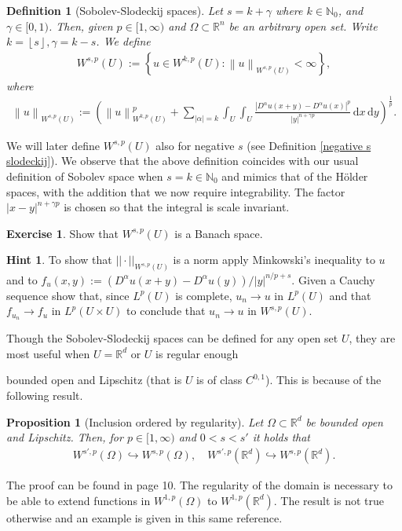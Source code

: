 \documentclass[
    a4paper,
    DIV=14,
    abstract=true,
    numbers=noenddot
]
{scrartcl}
\newtheorem{proposition}[theorem]{Proposition}
\newtheorem{definition}[theorem]{Definition}
\theoremstyle{definition}
\newtheorem{exercise}{Exercise}
\newtheorem*{hint}{Hint}
\newcommand{\set}[1]{\left\{#1\right\}}
\renewcommand{\norm}[1]{\left\lVert #1 \right\rVert}\renewcommand{\abs}[1]{\left| #1 \right|}
\renewcommand{\d}{\,\mathrm{d}}\newcommand{\dx}{\,\mathrm{d}x}
\newcommand{\N}{\mathbb{N}}
\newcommand{\R}{\mathbb{R}}
\begin{document}
\begin{definition}[Sobolev-Slodeckij spaces]\label{soledkij def}
    Let $s=k+\gamma$ where $k \in \N_0$, and $\gamma \in [0,1)$. Then, given  $p \in [1,\infty)$ and $\Omega  \subset \R^n$ be an arbitrary open set. Write $k=\left\lfloor s \right\rfloor,\gamma =k-s$.  We define
    \begin{align*}
        W^{s ,p}(U):= \set{u \in W^{k ,p}(U): \norm{u}_{W^{s,p}(U)}<\infty},
    \end{align*}
    where
    \begin{align}\label{norm def}
        \norm{u}_{W^{s,p}(U)}:= \left(\norm{u}_{W^{k,p}(U)}^p+ \sum_{\abs{\alpha}=k }\int_{U}\int_{U}\frac{\abs{D^\alpha u(x+y)-D^\alpha u(x)}^p}{\abs{y}^{n+\gamma p}}\d x \d y\right)^\frac{1}{p}.
    \end{align}
\end{definition}
We will later define $W^{s,p}(U)$ also for negative $s$ (see Definition \ref{negative s slodeckij}). We observe that the above definition coincides with our usual definition of Sobolev space when $s=k \in \N_0$ and  mimics that of the H\"older spaces, with the addition that we now require integrability. The factor $\abs{x-y}^{n+\gamma p}$ is chosen so that the integral is scale invariant.
\begin{exercise}
    Show that $W^{s,p}(U)$ is a Banach space.
\end{exercise}
\begin{hint}
    To show that $|| \cdot ||_{W^{s,p}(U)}$ is a norm apply Minkowski's inequality to $u$ and to $f_u(x,y):=(D^\alpha u(x+y)-D^\alpha  u(y))/|y|^{n/p+s}$. Given a Cauchy sequence show that, since $L^p(U)$ is complete, $u_n \to u$ in $L^p(U)$ and that $f_{u_n} \to f_u$ in $L^p(U\times U)$ to conclude that $u_n \to u$ in $W^{s,p}(U)$.
\end{hint}
Though the Sobolev-Slodeckij spaces can be defined for any open set $U$, they are most useful when $U=\R^d$ or $U$  is regular enough


bounded open and Lipschitz (that is $U$ is of class $C^{0,1}$). This is because of the following result.
\begin{proposition}[Inclusion ordered by regularity]
    Let  $\Omega \subset \R^d$ be bounded open and Lipschitz. Then, for $p \in [1,\infty)$ and $0<s<s'$ it holds that
    \begin{align*}
        W^{s',p}(\Omega )\hookrightarrow W^{s,p}(\Omega ), \quad W^{s',p}(\R^d)\hookrightarrow W^{s,p}(\R^d).
    \end{align*}
\end{proposition}
The proof can be found in \cite{di2012hitchhiker's} page 10. The regularity of the domain is necessary to be able to extend functions in $W^{1,p}(\Omega )$ to $W^{1,p}(\R^d)$. The result is not true otherwise and an example is given in this same reference.
\end{document}
